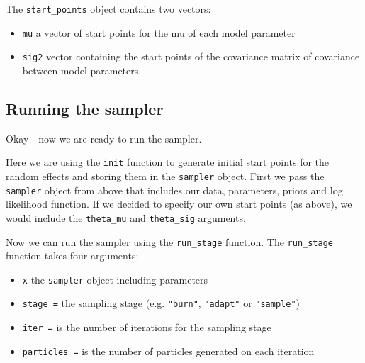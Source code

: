 \documentclass[]{book}
\newenvironment{Shaded}{\begin{snugshade}}{\end{snugshade}}
\newcommand{\DataTypeTok}[1]{\textcolor[rgb]{0.13,0.29,0.53}{#1}}
\newcommand{\KeywordTok}[1]{\textcolor[rgb]{0.13,0.29,0.53}{\textbf{#1}}}
\newcommand{\NormalTok}[1]{#1}
\newcommand{\OperatorTok}[1]{\textcolor[rgb]{0.81,0.36,0.00}{\textbf{#1}}}
\newcommand{\StringTok}[1]{\textcolor[rgb]{0.31,0.60,0.02}{#1}}
\providecommand{\tightlist}{%
  \setlength{\itemsep}{0pt}\setlength{\parskip}{0pt}}
\begin{document}
The \texttt{start\_points} object contains two vectors:

\begin{itemize}
\tightlist
\item
  \texttt{mu} a vector of start points for the mu of each model parameter
\item
  \texttt{sig2} vector containing the start points of the covariance matrix of covariance between model parameters.
\end{itemize}

\hypertarget{run-sampler}{%
\subsection{Running the sampler}\label{run-sampler}}

Okay - now we are ready to run the sampler.

\begin{Shaded}
\end{Shaded}

Here we are using the \texttt{init} function to generate initial start points for the random effects and storing them in the \texttt{sampler} object. First we pass the \texttt{sampler} object from above that includes our data, parameters, priors and log likelihood function. If we decided to specify our own start points (as above), we would include the \texttt{theta\_mu} and \texttt{theta\_sig} arguments.

Now we can run the sampler using the \texttt{run\_stage} function. The \texttt{run\_stage} function takes four arguments:

\begin{itemize}
\tightlist
\item
  \texttt{x} the \texttt{sampler} object including parameters
\item
  \texttt{stage\ =} the sampling stage (e.g. \texttt{"burn"}, \texttt{"adapt"} or \texttt{"sample"})
\item
  \texttt{iter\ =} is the number of iterations for the sampling stage
\item
  \texttt{particles\ =} is the number of particles generated on each iteration
\end{itemize}
\end{document}
